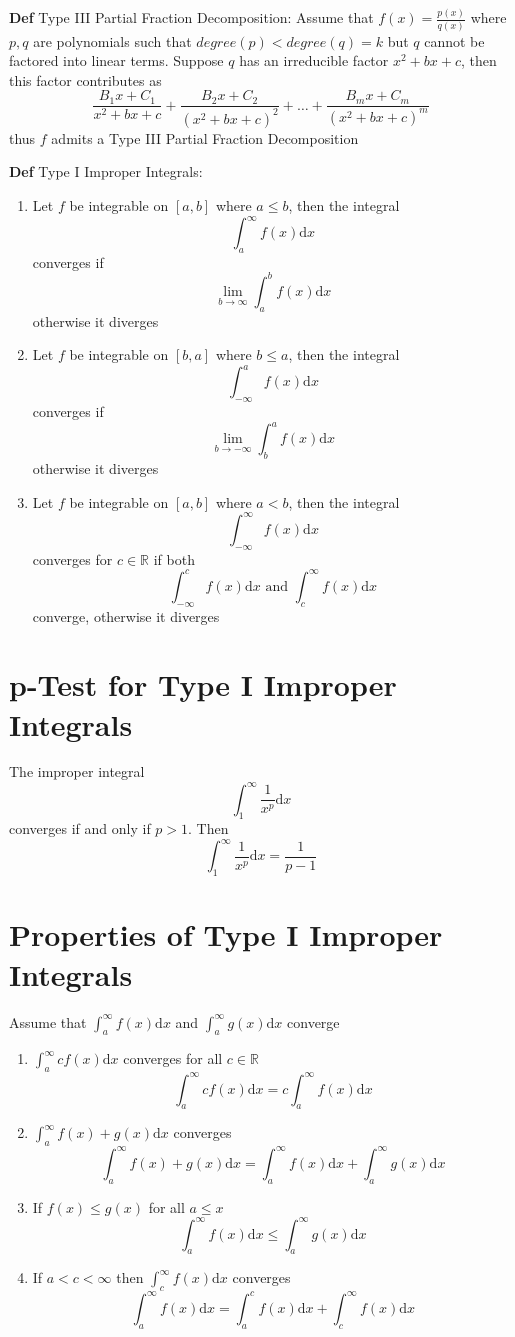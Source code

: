 \documentclass[11pt,notitlepage]{report}
\begin{document}
\textbf{Def} Type III Partial Fraction Decomposition: Assume that $f(x) = \frac{p(x)}{q(x)}$ where $p, q$ are polynomials such that $degree(p) < degree (q) = k$ but $q$ cannot be factored into linear terms. Suppose $q$ has an irreducible factor $x^2 +bx + c$, then this factor contributes as
$$\frac{B_1x+C_1}{x^2+bx+c} + \frac{B_2x+C_2}{(x^2+bx+c)^2} + \dots + \frac{B_mx+C_m}{(x^2+bx+c)^m}$$
thus $f$ admits a Type III Partial Fraction Decomposition

\textbf{Def} Type I Improper Integrals: 
\begin{enumerate}
    \item Let $f$ be integrable on $[a, b]$ where $a \leq b$, then the integral
    $$\int_a^\infty f(x) \mathrm{d}x$$ converges if $$\lim_{b \rightarrow \infty} \int_a^b f(x) \mathrm{d}x$$
    otherwise it diverges
    \item Let $f$ be integrable on $[b, a]$ where $b \leq a$, then the integral
    $$\int_{-\infty}^a f(x) \mathrm{d}x$$ converges if $$\lim_{b \rightarrow -\infty} \int_b^a f(x) \mathrm{d}x$$
    otherwise it diverges
    \item Let $f$ be integrable on $[a, b]$ where $a < b$, then the integral
    $$\int_{-\infty}^\infty f(x) \mathrm{d}x$$ converges for $c \in \mathbb R$ if both $$\int_{-\infty}^c f(x) \mathrm{d}x \text{ and } \int_c^\infty f(x) \mathrm{d}x$$
    converge, otherwise it diverges
\end{enumerate}

\section{p-Test for Type I Improper Integrals} The improper integral $$\int_1^\infty \frac{1}{x^p} \mathrm{d}x$$ converges if and only if $p > 1$. Then $$\int_1^\infty \frac{1}{x^p} \mathrm{d}x = \frac{1}{p-1}$$

\section{Properties of Type I Improper Integrals}Assume that $\int_a^\infty f(x) \mathrm{d}x$ and $\int_a^\infty g(x) \mathrm{d}x$ converge
\begin{enumerate}
    \item $\int_a^\infty cf(x) \mathrm{d}x$ converges for all $c \in \mathbb R$
    $$\int_a^\infty cf(x) \mathrm{d}x = c\int_a^\infty f(x) \mathrm{d}x$$
    \item $\int_a^\infty f(x) + g(x) \mathrm{d}x$ converges
    $$\int_a^\infty f(x) + g(x) \mathrm{d}x = \int_a^\infty f(x) \mathrm{d}x + \int_a^\infty g(x) \mathrm{d}x$$
    \item If $f(x) \leq g(x)$ for all $a \leq x$
    $$\int_a^\infty f(x) \mathrm{d}x \leq \int_a^\infty g(x) \mathrm{d}x$$
    \item If $a < c < \infty$ then $\int_c^\infty f(x) \mathrm{d}x$ converges
    $$\int_a^\infty f(x) \mathrm{d}x = \int_a^c f(x) \mathrm{d}x + \int_c^\infty f(x) \mathrm{d}x$$
\end{enumerate}
\end{document}
